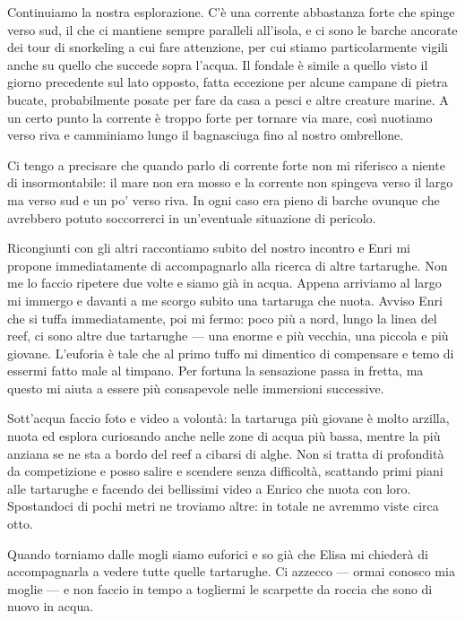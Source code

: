 Continuiamo la nostra esplorazione. C'è una corrente abbastanza forte che spinge verso sud, il che ci mantiene sempre paralleli all'isola, e ci sono le barche ancorate dei tour di snorkeling a cui fare attenzione, per cui stiamo particolarmente vigili anche su quello che succede sopra l'acqua. Il fondale è simile a quello visto il giorno precedente sul lato opposto, fatta eccezione per alcune campane di pietra bucate, probabilmente posate per fare da casa a pesci e altre creature marine. A un certo punto la corrente è troppo forte per tornare via mare, così nuotiamo verso riva e camminiamo lungo il bagnasciuga fino al nostro ombrellone.

Ci tengo a precisare che quando parlo di corrente forte non mi riferisco a niente di insormontabile: il mare non era mosso e la corrente non spingeva verso il largo ma verso sud e un po' verso riva. In ogni caso era pieno di barche ovunque che avrebbero potuto soccorrerci in un'eventuale situazione di pericolo.

Ricongiunti con gli altri raccontiamo subito del nostro incontro e Enri mi propone immediatamente di accompagnarlo alla ricerca di altre tartarughe. Non me lo faccio ripetere due volte e siamo già in acqua. Appena arriviamo al largo mi immergo e davanti a me scorgo subito una tartaruga che nuota. Avviso Enri che si tuffa immediatamente, poi mi fermo: poco più a nord, lungo la linea del reef, ci sono altre due tartarughe — una enorme e più vecchia, una piccola e più giovane. L'euforia è tale che al primo tuffo mi dimentico di compensare e temo di essermi fatto male al timpano. Per fortuna la sensazione passa in fretta, ma questo mi aiuta a essere più consapevole nelle immersioni successive.

Sott'acqua faccio foto e video a volontà: la tartaruga più giovane è molto arzilla, nuota ed esplora curiosando anche nelle zone di acqua più bassa, mentre la più anziana se ne sta a bordo del reef a cibarsi di alghe. Non si tratta di profondità da competizione e posso salire e scendere senza difficoltà, scattando primi piani alle tartarughe e facendo dei bellissimi video a Enrico che nuota con loro. Spostandoci di pochi metri ne troviamo altre: in totale ne avremmo viste circa otto.

Quando torniamo dalle mogli siamo euforici e so già che Elisa mi chiederà di accompagnarla a vedere tutte quelle tartarughe. Ci azzecco — ormai conosco mia moglie — e non faccio in tempo a togliermi le scarpette da roccia che sono di nuovo in acqua.

